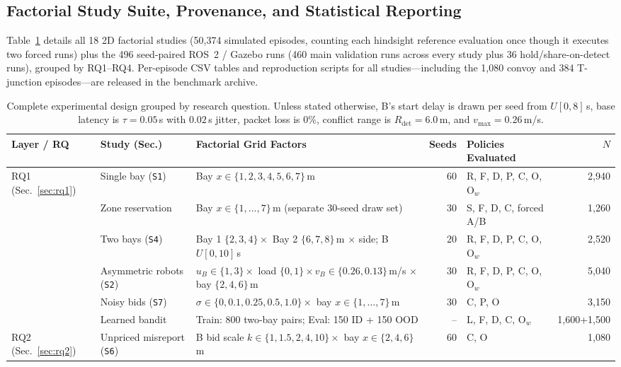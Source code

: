 \documentclass[letterpaper,journal]{IEEEtran}
\begin{document}
\subsection{Factorial Study Suite, Provenance, and Statistical Reporting}
Table~\ref{tab:design} details all 18 2D factorial studies (50,374 simulated episodes, counting each hindsight reference evaluation once though it executes two forced runs) plus the 496 seed-paired ROS~2 / Gazebo runs (460 main validation runs across every study plus 36 hold/share-on-detect runs), grouped by RQ1--RQ4. Per-episode CSV tables and reproduction scripts for all studies---including the 1,080 convoy and 384 T-junction episodes---are released in the benchmark archive.

\begin{table}[t]\centering
\caption{Complete experimental design grouped by research question. Unless stated otherwise, B's start delay is drawn per seed from $U[0,8]$\,s, base latency is $\tau=0.05$\,s with $0.02$\,s jitter, packet loss is $0\%$, conflict range is $R_{\mathrm{det}}=6.0$\,m, and $v_{\max}=0.26$\,m/s.}
\label{tab:design}
{\footnotesize\setlength{\tabcolsep}{3.4pt}
\begin{tabular}{@{}ll>{\raggedright\arraybackslash}p{}rlr@{}}\toprule
Layer / RQ & Study (Sec.) & Factorial Grid Factors & Seeds & Policies Evaluated & $N$ \\\midrule
\multirow{6}{*}{RQ1 (Sec.~\ref{sec:rq1})}
 & Single bay (\texttt{S1}) & Bay $x\in\{1,2,3,4,5,6,7\}$\,m & 60 & R, F, D, P, C, O, O$_w$ & 2,940 \\
 & Zone reservation & Bay $x\in\{1,\dots,7\}$\,m (separate 30-seed draw set) & 30 & S, F, D, C, forced A/B & 1,260 \\
 & Two bays (\texttt{S4}) & Bay 1 $\{2,3,4\}\times$ Bay 2 $\{6,7,8\}$\,m $\times$ side; B $U[0,10]$\,s & 20 & R, F, D, P, C, O, O$_w$ & 2,520 \\
 & Asymmetric robots (\texttt{S2}) & $u_B\in\{1,3\}\times$ load $\{0,1\}\times v_B\in\{0.26,0.13\}$\,m/s $\times$ bay $\{2,4,6\}$\,m & 30 & R, F, D, P, C, O, O$_w$ & 5,040 \\
 & Noisy bids (\texttt{S7}) & $\sigma\in\{0,0.1,0.25,0.5,1.0\}\times$ bay $x\in\{1,\dots,7\}$\,m & 30 & C, P, O & 3,150 \\
 & Learned bandit & Train: 800 two-bay pairs; Eval: 150 ID + 150 OOD & -- & L, F, D, C, O$_w$ & 1,600+1,500 \\\midrule
\multirow{3}{*}{RQ2 (Sec.~\ref{sec:rq2})}
 & Unpriced misreport (\texttt{S6}) & B bid scale $k\in\{1,1.5,2,4,10\}\times$ bay $x\in\{2,4,6\}$\,m & 60 & C, O & 1,080 \\

\end{tabular}}
\end{table}
\end{document}
